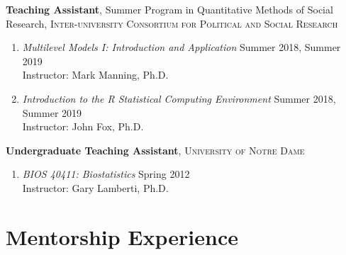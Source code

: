 \documentclass[letterpaper,11pt]{article} %
\begin{document}
		\noindent\textbf{Teaching Assistant}, Summer Program in Quantitative Methods of Social Research, \textsc{Inter-university Consortium for Political and Social Research}
		\begin{enumerate}
			\item \textit{Multilevel Models I: Introduction and Application} \hfill Summer 2018, Summer 2019\\
			Instructor: Mark Manning, Ph.D.
			
			\item \textit{Introduction to the R Statistical Computing Environment} \hfill Summer 2018, Summer 2019 \\
			Instructor: John Fox, Ph.D.
		\end{enumerate}
	
		\noindent \textbf{Undergraduate Teaching Assistant}, \textsc{University of Notre Dame} 
		\begin{enumerate}
			\item \textit{BIOS 40411: Biostatistics} \hfill Spring 2012 \\
			Instructor: Gary Lamberti, Ph.D.
		\end{enumerate}

    \section*{Mentorship Experience}
\end{document}
